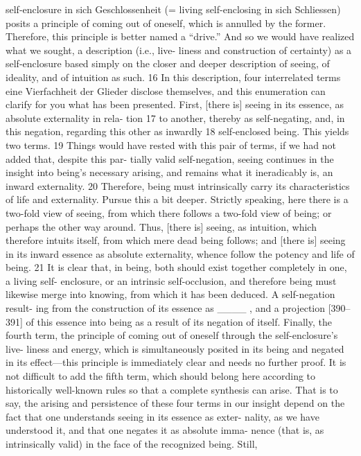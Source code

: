 self-enclosure {in sich Geschlossenheit} (= living self-enclosing {in sich
Schliessen}) posits a principle of coming out of oneself, which is annulled by
the former. Therefore, this principle is better named a “drive.”
And so we would have realized what we sought, a description (i.e., live-
liness and construction of certainty) as a self-enclosure based simply on the
closer and deeper description of seeing, of ideality, and of intuition as such. 16
In this description, four interrelated terms {eine Vierfachheit der Glieder}
disclose themselves, and this enumeration can clarify for you what has been
presented. First, [there is] seeing in its essence, as absolute externality in rela-
tion 17 to another, thereby as self-negating, and, in this negation, regarding this
other as inwardly 18 self-enclosed being. This yields two terms. 19 Things would
have rested with this pair of terms, if we had not added that, despite this par-
tially valid self-negation, seeing continues in the insight into being’s necessary
arising, and remains what it ineradicably is, an inward externality. 20 Therefore,
being must intrinsically carry its characteristics of life and externality. Pursue
this a bit deeper. Strictly speaking, here there is a two-fold view of seeing,
from which there follows a two-fold view of being; or perhaps the other way
around. Thus, [there is] seeing, as intuition, which therefore intuits itself, from
which mere dead being follows; and [there is] seeing in its inward essence as
absolute externality, whence follow the potency and life of being. 21 It is clear
that, in being, both should exist together completely in one, a living self-
enclosure, or an intrinsic self-occlusion, and therefore being must likewise
merge into knowing, from which it has been deduced. A self-negation result-
ing from the construction of its essence as ____ , and a projection [390–391]
of this essence into being as a result of its negation of itself. Finally, the fourth
term, the principle of coming out of oneself through the self-enclosure’s live-
liness and energy, which is simultaneously posited in its being and negated in
its effect—this principle is immediately clear and needs no further proof.
It is not difficult to add the fifth term, which should belong here
according to historically well-known rules so that a complete synthesis can
arise. That is to say, the arising and persistence of these four terms in our
insight depend on the fact that one understands seeing in its essence as exter-
nality, as we have understood it, and that one negates it as absolute imma-
nence (that is, as intrinsically valid) in the face of the recognized being. Still,
